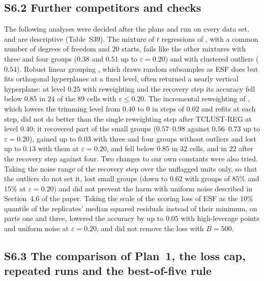 \subsection*{S6.2 Further competitors and checks}

The following analyses were decided after the plans and run on every data set, and are
descriptive (Table~S39). The mixture of $t$ regressions of \citet{yao2014robust}, with a common
number of degrees of freedom and $20$ starts, fails like the other mixtures with three and four
groups ($0.38$ and $0.51$ up to $\varepsilon=0.20$) and with clustered outliers ($0.54$).
Robust linear grouping \citep{garciaescudero2009robust}, which draws random subsamples as ESF
does but fits orthogonal hyperplanes at a fixed level, often returned a nearly vertical
hyperplane: at level $0.25$ with reweighting and the recovery step its accuracy fell below
$0.85$ in $24$ of the $89$ cells with $\varepsilon\le0.20$. The incremental reweighting of
\citet{dotto2018reweighting}, which lowers the trimming level from $0.40$ to $0$ in steps of
$0.02$ and refits at each step, did not do better than the single reweighting step after
TCLUST-REG at level $0.40$: it recovered part of the small groups ($0.57$--$0.98$ against
$0.56$--$0.73$ up to $\varepsilon=0.20$), gained up to $0.03$ with three and four groups without
outliers and lost up to $0.13$ with them at $\varepsilon=0.20$, and fell below $0.85$ in $32$
cells, and in $22$ after the recovery step against four. Two changes to our own constants were
also tried. Taking the noise range of the recovery step over the unflagged units only, so that
the outliers do not set it, lost small groups (down to $0.62$ with groups of $85\%$ and $15\%$
at $\varepsilon=0.20$) and did not prevent the harm with uniform noise described in
Section~4.6 of the paper. Taking the scale of the scoring loss of ESF as the $10\%$ quantile of
the replicates' median squared residuals instead of their minimum, on parts one and three,
lowered the accuracy by up to $0.05$ with high-leverage points and uniform noise at
$\varepsilon=0.20$, and did not remove the loss with $B=500$.

\subsection*{S6.3 The comparison of Plan~1, the loss cap, repeated runs and the best-of-five rule}

